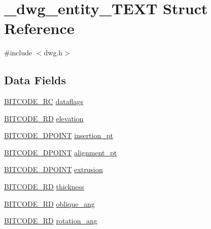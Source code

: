 \hypertarget{struct__dwg__entity__TEXT}{\section{\-\_\-dwg\-\_\-entity\-\_\-\-T\-E\-X\-T \-Struct \-Reference}
\label{struct__dwg__entity__TEXT}
}


{\ttfamily \#include $<$dwg.\-h$>$}

\subsection*{\-Data \-Fields}
\begin{DoxyCompactItemize}
\item 
\hyperlink{dwg_8h_a7fd199a8f9c9cc52bdab220f65a2a619}{\-B\-I\-T\-C\-O\-D\-E\-\_\-\-R\-C} \hyperlink{struct__dwg__entity__TEXT_aded2af528669be98ba6c0dcf68481e9e}{dataflags}
\item 
\hyperlink{dwg_8h_a309e7e59a4030a89943640d0d327cef7}{\-B\-I\-T\-C\-O\-D\-E\-\_\-\-R\-D} \hyperlink{struct__dwg__entity__TEXT_a064ea4ebbf5fc6abd7c1f046a9927a70}{elevation}
\item 
\hyperlink{dwg_8h_ab0367188e20f79ebcdabfe27d7fdf47c}{\-B\-I\-T\-C\-O\-D\-E\-\_\-D\-P\-O\-I\-N\-T} \hyperlink{struct__dwg__entity__TEXT_afe932237d3f7eb301f7a3ebd93eb8fce}{insertion\-\_\-pt}
\item 
\hyperlink{dwg_8h_ab0367188e20f79ebcdabfe27d7fdf47c}{\-B\-I\-T\-C\-O\-D\-E\-\_\-D\-P\-O\-I\-N\-T} \hyperlink{struct__dwg__entity__TEXT_a7c4490c4a6e8fc340cea8623ca754b56}{alignment\-\_\-pt}
\item 
\hyperlink{dwg_8h_a28caf4c2afeb01c45b68490ea6d81113}{\-B\-I\-T\-C\-O\-D\-E\-\_\-D\-P\-O\-I\-N\-T} \hyperlink{struct__dwg__entity__TEXT_a71c540fcd8cca7c04eee89d721c00911}{extrusion}
\item 
\hyperlink{dwg_8h_a309e7e59a4030a89943640d0d327cef7}{\-B\-I\-T\-C\-O\-D\-E\-\_\-\-R\-D} \hyperlink{struct__dwg__entity__TEXT_ab25a9957875678020b7dad3b2ab46f8a}{thickness}
\item 
\hyperlink{dwg_8h_a309e7e59a4030a89943640d0d327cef7}{\-B\-I\-T\-C\-O\-D\-E\-\_\-\-R\-D} \hyperlink{struct__dwg__entity__TEXT_aaca779641101b6c307bc356ec151b16d}{oblique\-\_\-ang}
\item 
\hyperlink{dwg_8h_a309e7e59a4030a89943640d0d327cef7}{\-B\-I\-T\-C\-O\-D\-E\-\_\-\-R\-D} \hyperlink{struct__dwg__entity__TEXT_a6b80c3c4dd68d015b9c07fbfd20ae216}{rotation\-\_\-ang}
\item 

\end{DoxyCompactItemize}
